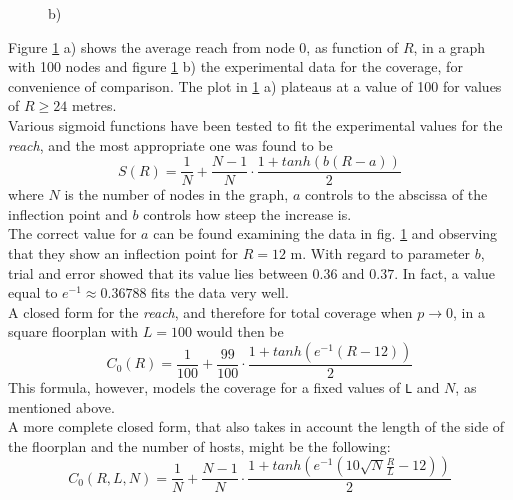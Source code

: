 \begin{figure}[H]
\begin{minipage}{.5\textwidth}
		\begin{center}
            b)
        \end{center}
	\end{minipage}
	\caption{}
    \label{fig:reachR30}
\end{figure}
\hfill \break
\hfill \break
Figure \ref{fig:reachR30} a) shows the average reach from node 0, as function of $R$, in a graph with 100 nodes and figure \ref{fig:reachR30} b) the experimental data for the coverage, for convenience of comparison. The plot in \ref{fig:reachR30} a)  plateaus at a value of 100 for values of $R \geq24$ metres. \\
Various sigmoid functions have been tested to fit the experimental values for the \textit{reach}, and the most appropriate one was found to be
\hfill \break
\begin{equation}\label{eq:reachSigmoidParametric}
	S(R) = \frac{1}{N} + \frac{N-1}{N}\cdot\frac{1+tanh(b(R-a))}{2}
\end{equation}
\hfill \break
where $N$ is the number of nodes in the graph, $a$ controls to the abscissa of the inflection point and $b$ controls how steep the increase is.\\
The correct value for $a$ can be found examining the data in fig. \ref{fig:reachR30} and observing that they show an inflection point for $R=12$ m. With regard to parameter $b$, trial and error showed that its value lies between $0.36$ and $0.37$. In fact, a value equal to $e^{-1} \approx 0.36788$ fits the data very well.\\
A closed form for the \textit{reach}, and therefore for total coverage when $p \to 0$, in a square floorplan with $L=100$ would then be
\hfill \break
\begin{equation}\label{eq:reachSigmoidNoL}
	C_{0}(R) = \frac{1}{100} + \frac{99}{100}\cdot\frac{1+tanh(e^{-1}(R - 12))}{2}
\end{equation}
\hfill \break
This formula, however, models the coverage for a fixed values of \texttt{L} and $N$, as mentioned above.\\
A more complete closed form, that also takes in account the length of the side of the floorplan and the number of hosts, might be the following:
\hfill \break
\begin{equation}\label{eq:reachSigmoidL}
	C_{0}(R, L, N) = \frac{1}{N} + \frac{N-1}{N}\cdot\frac{1+tanh(e^{-1}(10\sqrt{N}\frac{R}{L} - 12))}{2}
\end{equation}
\hfill \break
